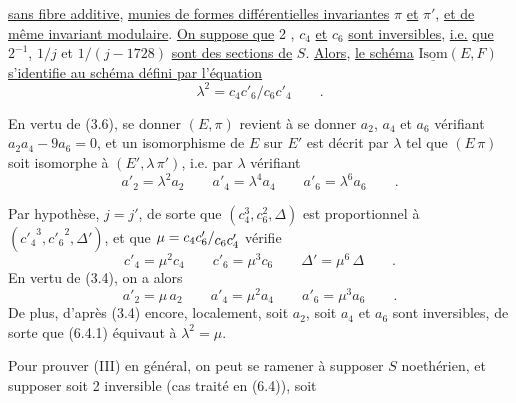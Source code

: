 \uline{sans fibre additive}, \uline{munies de formes différentielles invariantes} $\pi$ \uline{et} $\pi'$, \uline{et de même invariant modulaire}. \uline{On suppose que} 2 , $c_4$ \uline{et} $c_6$ \uline{sont inversibles}, \uline{i.e.} \uline{que} $2^{-1}$, $1/j$ et $1/(j-1728)$ \uline{sont des sections de} $S$. \uline{Alors}, \uline{le schéma} $\underline{\mathrm{Isom}}(E,F)$ \uline{s'identifie au schéma défini par l'équation}
\[
\lambda^2=c_4c'_6/c_6c'_4\qquad .
\]

En vertu de (3.6), se donner $(E,\pi)$ revient à se donner $a_2$, $a_4$ et $a_6$ vérifiant $a_2a_4-9a_6=0$, et un isomorphisme de $E$ sur $E'$ est décrit par $\lambda$ tel que $(E\,\pi)$ soit isomorphe à $(E',\lambda\,\pi')$, i.e. par $\lambda$ vérifiant
\[
a'_2=\lambda^2a_2\qquad a'_4=\lambda^4a_4\qquad a'_6=\lambda^6a_6\qquad .\tag*{(6.4.1)}
\]

Par hypothèse, $j=j'$, de sorte que $(c_4^3,c_6^2,\Delta)$ est proportionnel à $({c'_4}^3,{c'_6}^2,\Delta')$, et que $\mu=c_4c'_6/\raisebox{-.45ex}{$c_6c'_4$}$ vérifie
\[
c'_4=\mu^2c_4\qquad c'_6=\mu^3c_6\qquad \Delta'=\mu^6\,\Delta\qquad .\tag*{(6.4.2)}
\]
En vertu de (3.4), on a alors\margin{\handwritten{\unsure{--}}}
\[
a'_2=\mu\,a_2\qquad a'_4=\mu^2a_4\qquad a'_6=\mu^3a_6\qquad .
\]
De plus, d'après (3.4) encore, localement, soit $a_2$, soit $a_4$ et $a_6$ sont inversibles, de sorte que (6.4.1) équivaut à $\lambda^2=\mu$.

Pour prouver (III) en général, on peut se ramener à supposer $S$ noethérien, et supposer soit 2 inversible (cas traité en (6.4)), soit
